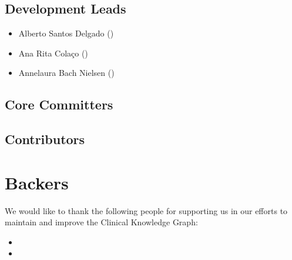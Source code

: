 \documentclass[letterpaper,10pt,english]{sphinxmanual}
\begin{document}
\subsection{Development Leads}
\label{\detokenize{MANIFEST:development-leads}}\begin{itemize}
\item {} 
Alberto Santos Delgado ()

\item {} 
Ana Rita Colaço ()

\item {} 
Annelaura Bach Nielsen ()

\end{itemize}


\subsection{Core Committers}
\label{\detokenize{MANIFEST:core-committers}}

\subsection{Contributors}
\label{\detokenize{MANIFEST:contributors}}

\section{Backers}
\label{\detokenize{MANIFEST:backers}}
We would like to thank the following people for supporting us in our efforts to maintain and improve the Clinical Knowledge Graph:
\begin{itemize}
\item {} 
\item {} 
\end{itemize}
\end{document}
